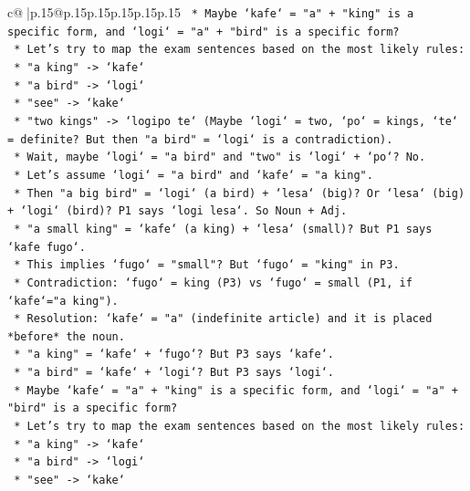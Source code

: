 \documentclass{article}
\begin{document}
{\begin{supertabular}{c@{$\;$}|p{.15\linewidth}@{}p{.15\linewidth}p{.15\linewidth}p{.15\linewidth}p{.15\linewidth}p{.15\linewidth}}
{{{\texttt{            *   Maybe `kafe` = "a" + "king" is a specific form, and `logi` = "a" + "bird" is a specific form?} \\
\texttt{            *   Let's try to map the exam sentences based on the most likely rules:} \\
\texttt{                *   "a king" {-}> `kafe`} \\
\texttt{                *   "a bird" {-}> `logi`} \\
\texttt{                *   "see" {-}> `kake`} \\
\texttt{                *   "two kings" {-}> `logipo te` (Maybe `logi` = two, `po` = kings, `te` = definite? But then "a bird" = `logi` is a contradiction).} \\
\texttt{                *   Wait, maybe `logi` = "a bird" and "two" is `logi` + `po`? No.} \\
\texttt{                *   Let's assume `logi` = "a bird" and `kafe` = "a king".} \\
\texttt{                *   Then "a big bird" = `logi` (a bird) + `lesa` (big)? Or `lesa` (big) + `logi` (bird)? P1 says `logi lesa`. So Noun + Adj.} \\
\texttt{                *   "a small king" = `kafe` (a king) + `lesa` (small)? But P1 says `kafe fugo`.} \\
\texttt{                *   This implies `fugo` = "small"? But `fugo` = "king" in P3.} \\
\texttt{                *   Contradiction: `fugo` = king (P3) vs `fugo` = small (P1, if `kafe`="a king").} \\
\texttt{                *   Resolution: `kafe` = "a" (indefinite article) and it is placed *before* the noun.} \\
\texttt{                    *   "a king" = `kafe` + `fugo`? But P3 says `kafe`.} \\
\texttt{                    *   "a bird" = `kafe` + `logi`? But P3 says `logi`.} \\
\texttt{                *   Maybe `kafe` = "a" + "king" is a specific form, and `logi` = "a" + "bird" is a specific form?} \\
\texttt{                *   Let's try to map the exam sentences based on the most likely rules:} \\
\texttt{                    *   "a king" {-}> `kafe`} \\
\texttt{                    *   "a bird" {-}> `logi`} \\
\texttt{                    *   "see" {-}> `kake`} \\
}}}
\end{supertabular}}
\end{document}
